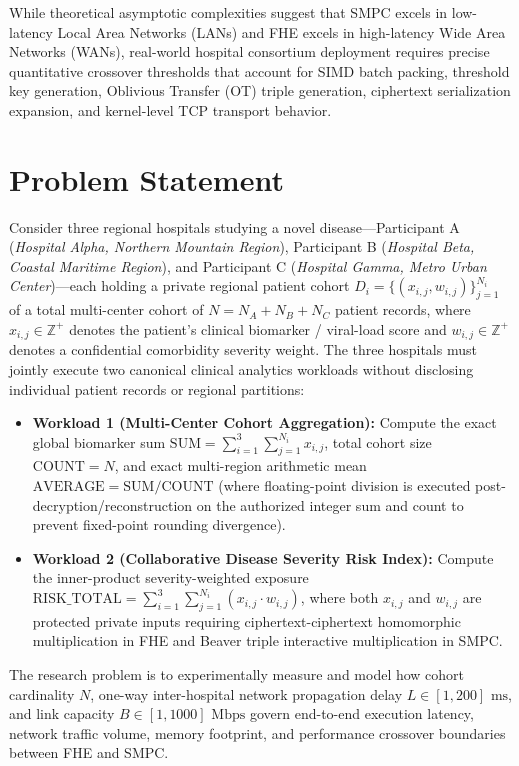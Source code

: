 \documentclass[conference]{IEEEtran}
\begin{document}
While theoretical asymptotic complexities suggest that SMPC excels in low-latency Local Area Networks (LANs) and FHE excels in high-latency Wide Area Networks (WANs), real-world hospital consortium deployment requires precise quantitative crossover thresholds that account for SIMD batch packing, threshold key generation, Oblivious Transfer (OT) triple generation, ciphertext serialization expansion, and kernel-level TCP transport behavior.

\section{Problem Statement}
Consider three regional hospitals studying a novel disease---Participant A (\emph{Hospital Alpha, Northern Mountain Region}), Participant B (\emph{Hospital Beta, Coastal Maritime Region}), and Participant C (\emph{Hospital Gamma, Metro Urban Center})---each holding a private regional patient cohort $D_i = \{(x_{i,j}, w_{i,j})\}_{j=1}^{N_i}$ of a total multi-center cohort of $N = N_A + N_B + N_C$ patient records, where $x_{i,j} \in \mathbb{Z}^+$ denotes the patient's clinical biomarker / viral-load score and $w_{i,j} \in \mathbb{Z}^+$ denotes a confidential comorbidity severity weight. The three hospitals must jointly execute two canonical clinical analytics workloads without disclosing individual patient records or regional partitions:
\begin{itemize}
    \item \textbf{Workload 1 (Multi-Center Cohort Aggregation):} Compute the exact global biomarker sum $\text{SUM} = \sum_{i=1}^3 \sum_{j=1}^{N_i} x_{i,j}$, total cohort size $\text{COUNT} = N$, and exact multi-region arithmetic mean $\text{AVERAGE} = \text{SUM} / \text{COUNT}$ (where floating-point division is executed post-decryption/reconstruction on the authorized integer sum and count to prevent fixed-point rounding divergence).
    \item \textbf{Workload 2 (Collaborative Disease Severity Risk Index):} Compute the inner-product severity-weighted exposure $\text{RISK\_TOTAL} = \sum_{i=1}^3 \sum_{j=1}^{N_i} (x_{i,j} \cdot w_{i,j})$, where both $x_{i,j}$ and $w_{i,j}$ are protected private inputs requiring ciphertext-ciphertext homomorphic multiplication in FHE and Beaver triple interactive multiplication in SMPC.
\end{itemize}
The research problem is to experimentally measure and model how cohort cardinality $N$, one-way inter-hospital network propagation delay $L \in [1, 200]\text{ ms}$, and link capacity $B \in [1, 1000]\text{ Mbps}$ govern end-to-end execution latency, network traffic volume, memory footprint, and performance crossover boundaries between FHE and SMPC.
\end{document}
